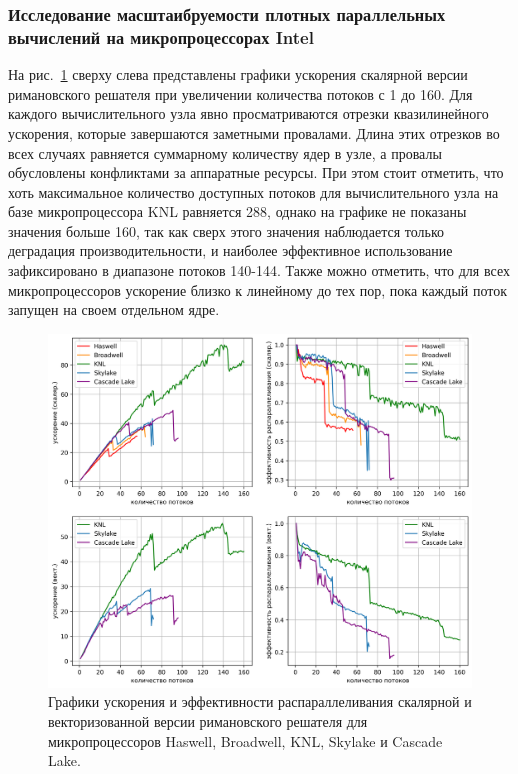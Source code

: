 \subsubsection{Исследование масштаибруемости плотных параллельных вычислений на микропроцессорах Intel}

На рис.~\ref{fig:text_3_omp2} сверху слева представлены графики ускорения скалярной версии римановского решателя при увеличении количества потоков с 1 до 160.
Для каждого вычислительного узла явно просматриваются отрезки квазилинейного ускорения, которые завершаются заметными провалами.
Длина этих отрезков во всех случаях равняется суммарному количеству ядер в узле, а провалы обусловлены конфликтами за аппаратные ресурсы.
При этом стоит отметить, что хоть максимальное количество доступных потоков для вычислительного узла на базе микропроцессора KNL равняется 288, однако на графике не показаны значения больше 160, так как сверх этого значения наблюдается только деградация производительности, и наиболее эффективное использование зафиксировано в диапазоне потоков 140-144.
Также можно отметить, что для всех микропроцессоров ускорение близко к линейному до тех пор, пока каждый поток запущен на своем отдельном ядре.

\begin{figure}[ht]
\centering
\includegraphics[width=1.0\textwidth]{./pics/text_3_omp2/main_chart.png}
\singlespacing
{}\caption{Графики ускорения и эффективности распараллеливания скалярной и векторизованной версии римановского решателя для микропроцессоров Haswell, Broadwell, KNL, Skylake и Cascade Lake.}
\label{fig:text_3_omp2}
\end{figure}

